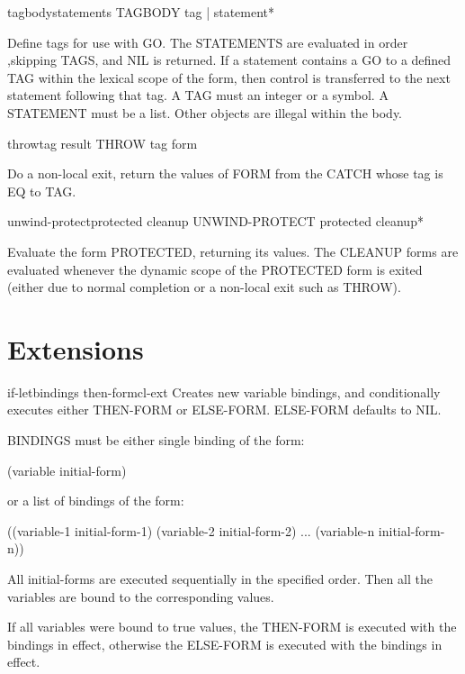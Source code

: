 \begin{specialop}{tagbody}{\rest statements}{}{}
  TAGBODY {tag | statement}*

Define tags for use with GO. The STATEMENTS are evaluated in order ,skipping
TAGS, and NIL is returned. If a statement contains a GO to a defined TAG
within the lexical scope of the form, then control is transferred to the next
statement following that tag. A TAG must an integer or a symbol. A STATEMENT
must be a list. Other objects are illegal within the body.
\end{specialop}

\begin{specialop}{throw}{tag result}{}{}
  THROW tag form

Do a non-local exit, return the values of FORM from the CATCH whose tag is EQ
to TAG.
\end{specialop}

\begin{specialop}{unwind-protect}{protected \body cleanup}{}{}
  UNWIND-PROTECT protected cleanup*

Evaluate the form PROTECTED, returning its values. The CLEANUP forms are
evaluated whenever the dynamic scope of the PROTECTED form is exited (either
due to normal completion or a non-local exit such as THROW).
\end{specialop}

\section{Extensions}
\label{sec:extensions}

\begin{macro}{if-let}{bindings \body then-form}{cl-ext}{}
  Creates new variable bindings, and conditionally executes either
THEN-FORM or ELSE-FORM. ELSE-FORM defaults to NIL.

BINDINGS must be either single binding of the form:

 (variable initial-form)

or a list of bindings of the form:

 ((variable-1 initial-form-1)
  (variable-2 initial-form-2)
  ...
  (variable-n initial-form-n))

All initial-forms are executed sequentially in the specified order. Then all
the variables are bound to the corresponding values.

If all variables were bound to true values, the THEN-FORM is executed with the
bindings in effect, otherwise the ELSE-FORM is executed with the bindings in
effect.
\end{macro}


